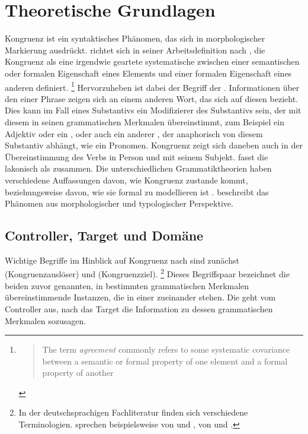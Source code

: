\chapter{Theoretische Grundlagen}
\label{ch:theorie}

Kongruenz ist ein syntaktisches Phänomen, das sich in morphologischer
Markierung ausdrückt. \citet{corbett2006} richtet sich in seiner
Arbeitsdefinition nach \citet[610]{steele1978}, die Kongruenz als eine
irgendwie geartete systematische  zwischen einer semantischen
oder formalen Eigenschaft eines Elements und einer formalen Eigenschaft eines
anderen definiert.%
%
	\footnote{\blockcquote[610]{steele1978}{The term \emph{agreement} commonly
		refers to some systematic covariance between a semantic or formal
		property of one element and a formal property of another}.%
	}
%
Hervorzuheben ist dabei der Begriff der . Informationen über den
 einer Phrase zeigen sich an einem anderen Wort, das sich auf diesen
 bezieht. Dies kann im Fall eines Substantivs ein
Modifizierer des Substantivs sein, der mit diesem in seinen grammatischen
Merkmalen übereinstimmt, zum Beispiel ein
Adjektiv oder ein , oder auch ein anderer
, der anaphorisch von diesem Substantiv abhängt, wie ein
Pronomen. Kongruenz zeigt sich daneben auch in der Übereinstimmung des Verbs in
Person und  mit seinem Subjekt. \citet[20]{corbett2006} fasst die
 lakonisch als  zusammen. Die unterschiedlichen Grammatiktheorien
haben verschiedene Auffassungen davon, wie Kongruenz zustande kommt,
beziehungsweise davon, wie sie formal zu modellieren ist
\autocite[siehe~z.\,B.][]{mueller2023}. \citeauthor{corbett2006} beschreibt das
Phänomen aus morphologischer und typologischer Perspektive.


\section{Controller, Target und Domäne}
\label{sec:ctrltarg}


Wichtige Begriffe im Hinblick auf Kongruenz nach \citet{corbett2006} sind
zunächst  (Kongruenzauslöser) und  (Kongruenzziel).%
%
	\footnote{In der deutschsprachigen Fachliteratur finden sich verschiedene
	Terminologien. \citet{fleischerschallert2011} sprechen beispielsweise von
	 und , \citet{panther2009} von
	 und .}
%
Dieses Begriffspaar bezeichnet die beiden zuvor genannten, in bestimmten
grammatischen Merkmalen übereinstimmende Instanzen,
die in einer  zueinander stehen. Die
 geht vom Controller aus, nach \citeauthor{corbett2006}
 das Target die Information zu dessen grammatischen
Merkmalen sozusagen.

